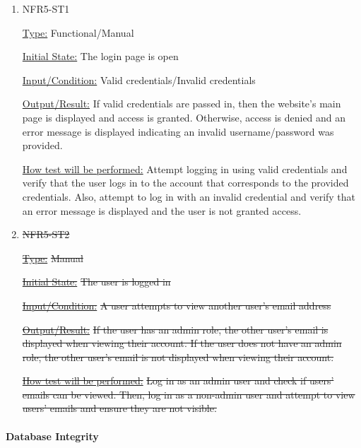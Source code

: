 \documentclass[12pt, titlepage]{article}
\begin{document}
\begin{enumerate}

\item{NFR5-ST1\\}

\underline{Type:} Functional/Manual

\underline{Initial State:} The login page is open

\underline{Input/Condition:} Valid credentials/Invalid credentials

\underline{Output/Result:} If valid credentials are passed in, then the website's main page is displayed and access is granted. Otherwise, access is denied and an error message is displayed indicating an invalid username/password was provided.

\underline{How test will be performed:} 
Attempt logging in using valid credentials and verify that the user logs in to the account that corresponds to the provided credentials. Also, attempt to log in with an invalid credential and verify that an error message is displayed and the user is not granted access.

\item{\sout{NFR5-ST2\\}}

\underline{\sout{Type:}} \sout{Manual}

\underline{\sout{Initial State:}} \sout{The user is logged in}

\underline{\sout{Input/Condition:}} \sout{A user attempts to view another user’s email address}

\underline{\sout{Output/Result:}} \sout{If the user has an admin role, the other user’s email is displayed when viewing their account. If the user does not have an admin role, the other user’s email is not displayed when viewing their account. }

\underline{\sout{How test will be performed:}}
\sout{Log in as an admin user and check if users’ emails can be viewed. Then, log in as a non-admin user and attempt to view users’ emails and ensure they are not visible.}

\end{enumerate}

\paragraph{Database Integrity}
\end{document}
